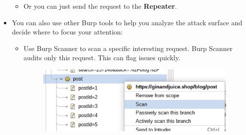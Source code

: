 \documentclass[
	a4paper, %
	12pt, %
]{CSSullivanBusinessReport}
\begin{document}
\begin{fullwidth}
\begin{itemize}
\begin{itemize}
\begin{figure}[H]
    
\end{figure}
            \item Or you can just send the request to the {\color{orange}\textbf{Repeater}}.
        \end{itemize}

    \item You can also use other Burp tools to help you analyze the attack surface and decide where to focus your attention:
        \begin{itemize}
            \item Use Burp Scanner to scan a specific interesting request. Burp Scanner audits only this request. This can flag issues quickly.
            \begin{figure}[H]
                \centering
                \includegraphics[width=0.5\linewidth]{Images//Mapping/sending_scanner.png}
                
                
            \end{figure}
        \end{itemize}
    \end{itemize}
\end{fullwidth}


\end{document}
